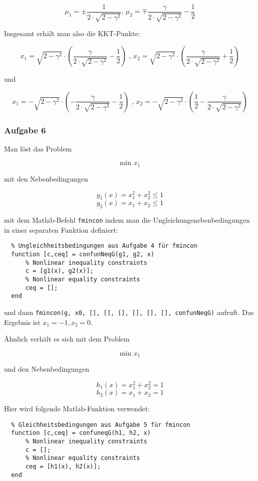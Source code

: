 \documentclass[a4paper, 12pt]{report}
\begin{document}
$$\mu_1 = \pm \frac{1}{2\cdot \sqrt{2 - \gamma^2}} \text{, } \mu_2 = \mp \frac{\gamma}{2\cdot \sqrt{2 - \gamma^2}} - \frac{1}{2}$$

Insgesamt erhält man also die KKT-Punkte:

$$x_1 = \sqrt{2 - \gamma^2} \cdot \left( \frac{\gamma}{2\cdot\sqrt{2 - \gamma^2}} - \frac{1}{2} \right) \text{ , } x_2 = \sqrt{2 - \gamma^2} \cdot \left( \frac{\gamma}{2\cdot\sqrt{2 - \gamma^2}} + \frac{1}{2} \right)$$

und

$$x_1 = -\sqrt{2 - \gamma^2}\cdot \left(-\frac{\gamma}{2\cdot \sqrt{2 - \gamma^2}} - \frac{1}{2}\right) \text{ , } x_2 = -\sqrt{2 - \gamma^2} \cdot \left( \frac{1}{2} - \frac{\gamma}{2\cdot\sqrt{2 - \gamma^2}} \right)$$

\subsubsection{Aufgabe 6}

Man löst das Problem

$$\text{min } x_1$$

mit den Nebenbedingungen

$$g_1(x) = x_1^2 + x_2^2 \leq 1$$
$$g_2(x) = x_1 + x_2 \leq 1$$

mit dem Matlab-Befehl \lstinline[basicstyle=\ttfamily\color{black}]|fmincon| indem man die Ungleichungsnebenbedingungen in einer separaten Funktion
definiert:

\begin{lstlisting}
  % Ungleichheitsbedingungen aus Aufgabe 4 für fmincon
  function [c,ceq] = confunNeqG(g1, g2, x)
      % Nonlinear inequality constraints
      c = [g1(x), g2(x)];
      % Nonlinear equality constraints
      ceq = [];
  end\end{lstlisting}

und dann \lstinline|fmincon(g, x0, [], [], [], [], [], [], confunNeqG)| aufruft. Das Ergebnis ist $x_1 = -1, x_2 = 0$.

Ähnlich verhält es sich mit dem Problem

$$\text{min } x_1$$

und den Nebenbedingungen

$$h_1(x) = x_1^2 + x_2^2 = 1$$
$$h_2(x) = x_1 + x_2 = 1$$

Hier wird folgende Matlab-Funktion verwendet:

\begin{lstlisting}
  % Gleichheitsbedingungen aus Aufgabe 5 für fmincon
  function [c,ceq] = confuneqG(h1, h2, x)
      % Nonlinear inequality constraints
      c = [];
      % Nonlinear equality constraints
      ceq = [h1(x), h2(x)];
  end\end{lstlisting}
\end{document}

